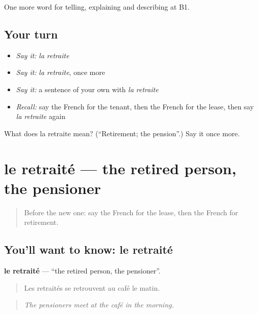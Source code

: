 \begin{grammarlens}[title={What you've built}]
One more word for telling, explaining and describing at B1.
\end{grammarlens}

\subsection*{Your turn}
\begin{itemize}
\raggedright
  \item \emph{Say it:} \emph{la retraite}
  \item \emph{Say it:} \emph{la retraite}, once more
  \item \emph{Say it:} a sentence of your own with \emph{la retraite}
  \item \emph{Recall:} say the French for the tenant, then the French for the lease, then say \emph{la retraite} again
\end{itemize}

\begin{tcolorbox}[breakable,colback=teal!4,colframe=teal!35!black,title={Before you move on}]
What does la retraite mean? (\textquotedblleft{}Retirement; the pension\textquotedblright{}.) Say it once more.
\end{tcolorbox}
\section[le retraité]{le retraité — the retired person, the pensioner}

\label{lesson:FR-C313-retraite-personne}



\begin{quote}
Before the new one: say the French for the lease, then the French for retirement.
\end{quote}

\subsection*{You'll want to know: le retraité}
\textbf{le retraité} — \textquotedblleft{}the retired person, the pensioner\textquotedblright{}.

\begin{quote}
Les retraités se retrouvent au café le matin.
\end{quote}

\begin{quote}
\emph{The pensioners meet at the café in the morning.}
\end{quote}

